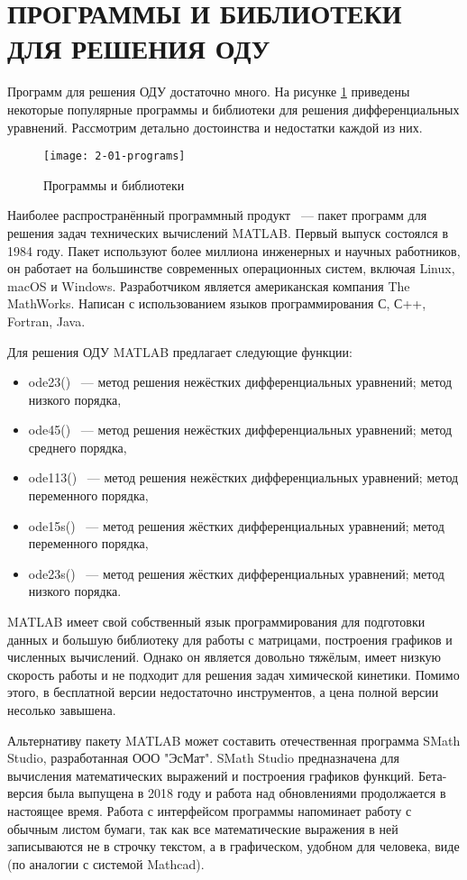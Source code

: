 \section{ПРОГРАММЫ И БИБЛИОТЕКИ ДЛЯ РЕШЕНИЯ ОДУ}

Программ для решения ОДУ достаточно много. На рисунке \ref{fig:programs} приведены
некоторые популярные программы и библиотеки для решения дифференциальных
уравнений. Рассмотрим детально достоинства и недостатки каждой из них.

\begin{figure}
    \texttt{[image: 2-01-programs]}
    \caption{Программы и библиотеки}
    \label{fig:programs}
\end{figure}

Наиболее распространённый программный продукт ~--- пакет программ для решения задач технических вычислений MATLAB. Первый выпуск состоялся в 1984 году. Пакет используют
более миллиона инженерных и научных работников, он работает на большинстве современных операционных систем, включая Linux, macOS и
Windows. Разработчиком является американская компания The MathWorks. Написан с использованием языков программирования С, С++, Fortran,
Java.

Для решения ОДУ MATLAB предлагает следующие функции:
\begin{itemize}
    \item ode23() ~--- метод решения нежёстких дифференциальных уравнений; метод низкого порядка,
    \item ode45() ~--- метод решения нежёстких дифференциальных уравнений; метод среднего порядка,
    \item ode113() ~--- метод решения нежёстких дифференциальных уравнений; метод переменного порядка,
    \item ode15s() ~--- метод решения жёстких дифференциальных уравнений; метод переменного порядка,
    \item ode23s() ~--- метод решения жёстких дифференциальных уравнений; метод низкого порядка.
\end{itemize}

MATLAB имеет свой собственный язык программирования для подготовки данных и большую библиотеку для работы с матрицами, построения
графиков и численных вычислений. Однако он является довольно тяжёлым, имеет низкую скорость работы и не
подходит для решения задач химической кинетики. Помимо этого, в бесплатной версии недостаточно инструментов, а цена полной версии
несолько завышена.

Альтернативу пакету MATLAB может составить отечественная программа SMath Studio, разработанная ООО "ЭсМат".
SMath Studio предназначена для вычисления математических выражений и построения графиков функций. Бета-версия была выпущена в 2018
году и работа над обновлениями продолжается в настоящее время. Работа с интерфейсом
программы напоминает работу с обычным листом бумаги, так как все математические выражения в ней записываются не в строчку текстом,
а в графическом, удобном для человека, виде (по аналогии с системой Mathcad).

